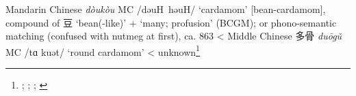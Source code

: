 \begin{etymology}\label{ety:doukou}
Mandarin Chinese {} \textit{dòukòu} \gls{MC} /dəuH həuH/ `cardamom' [bean-cardamom], compound of 豆 `bean(-like)' +  `many; profusion' (BCGM); or phono-semantic matching (confused with nutmeg at first), ca. 863
< Middle Chinese {多骨} \textit{duōgǔ} \gls{MC} /tɑ kuət/ `round cardamom'
< unknown\footnote{\textcite[22]{donkin_between_2003}; \textcite[18:55]{yyzz}; \textcite[292]{pali_text_society_pali_1921}; \textcite[431, 241]{monier-williams_sanskrit-english_1899}}
\end{etymology}